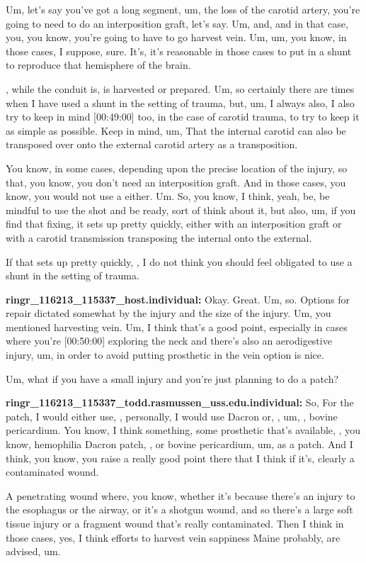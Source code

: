 \documentclass[
]{book}
\begin{document}
Um, let's say you've got a long segment, um, the loss of the carotid
artery, you're going to need to do an interposition graft, let's say.
Um, and, and in that case, you, you know, you're going to have to go
harvest vein. Um, um, you know, in those cases, I suppose, sure. It's,
it's reasonable in those cases to put in a shunt to reproduce that
hemisphere of the brain.

, while the conduit is, is harvested or prepared. Um, so certainly there
are times when I have used a shunt in the setting of trauma, but, um, I
always also, I also try to keep in mind {[}00:49:00{]} too, in the case of
carotid trauma, to try to keep it as simple as possible. Keep in mind,
um, That the internal carotid can also be transposed over onto the
external carotid artery as a transposition.

You know, in some cases, depending upon the precise location of the
injury, so that, you know, you don't need an interposition graft. And in
those cases, you know, you would not use a either. Um. So, you know, I
think, yeah, be, be mindful to use the shot and be ready, sort of think
about it, but also, um, if you find that fixing, it sets up pretty
quickly, either with an interposition graft or with a carotid
transmission transposing the internal onto the external.

If that sets up pretty quickly, , I do not think you should feel
obligated to use a shunt in the setting of trauma.

\textbf{ringr\_116213\_115337\_host.individual:} Okay. Great. Um, so. Options
for repair dictated somewhat by the injury and the size of the injury.
Um, you mentioned harvesting vein. Um, I think that's a good point,
especially in cases where you're {[}00:50:00{]} exploring the neck and
there's also an aerodigestive injury, um, in order to avoid putting
prosthetic in the vein option is nice.

Um, what if you have a small injury and you're just planning to do a
patch?

\textbf{ringr\_116213\_115337\_todd.rasmussen\_uss.edu.individual:} So, For the
patch, I would either use, , personally, I would use Dacron or, , um, ,
bovine pericardium. You know, I think something, some prosthetic that's
available, , you know, hemophilia Dacron patch, , or bovine pericardium,
um, as a patch. And I think, you know, you raise a really good point
there that I think if it's, clearly a contaminated wound.

A penetrating wound where, you know, whether it's because there's an
injury to the esophagus or the airway, or it's a shotgun wound, and so
there's a large soft tissue injury or a fragment wound that's really
contaminated. Then I think in those cases, yes, I think efforts to
harvest vein sappiness Maine probably, are advised, um.
\end{document}
